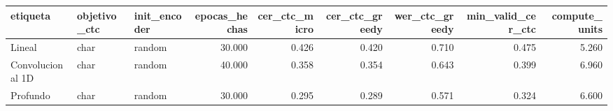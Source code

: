 \begin{tabular}{lllrrrrrr}
\toprule
etiqueta & objetivo_ctc & init_encoder & epocas_hechas & cer_ctc_micro & cer_ctc_greedy & wer_ctc_greedy & min_valid_cer_ctc & compute_units \\
\midrule
Lineal & char & random & 30.000 & 0.426 & 0.420 & 0.710 & 0.475 & 5.260 \\
Convolucional 1D & char & random & 40.000 & 0.358 & 0.354 & 0.643 & 0.399 & 6.960 \\
Profundo & char & random & 30.000 & 0.295 & 0.289 & 0.571 & 0.324 & 6.600 \\
\bottomrule
\end{tabular}
